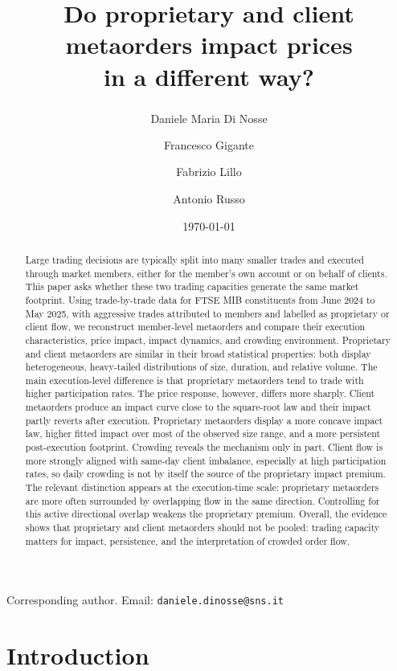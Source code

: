 \documentclass[11pt]{article}
\title{Do proprietary and client metaorders impact prices \\ in a different way?}
\author[1]{Daniele Maria Di Nosse\textsuperscript{\dag}}
\author[2]{Francesco Gigante}
\author[1]{Fabrizio Lillo}
\author[2]{Antonio Russo}
\affil[1]{Scuola Normale Superiore, Pisa, Italy}
\affil[2]{Consob, Rome, Italy}
\date{\today}
\begin{document}
\maketitle
\begin{center}
  \footnotesize
  \dag Corresponding author. Email: \texttt{daniele.dinosse@sns.it}
\end{center}

\begin{abstract}
Large trading decisions are typically split into many smaller trades and executed through market members, 
either for the member’s own account or on behalf of clients. This paper asks whether these two trading 
capacities generate the same market footprint. Using trade-by-trade data for FTSE MIB constituents from June 
2024 to May 2025, with aggressive trades attributed to members and labelled as proprietary or client flow, we 
reconstruct member-level metaorders and compare their execution characteristics, price impact, impact dynamics, 
and crowding environment.
Proprietary and client metaorders are similar in their broad statistical properties: both display heterogeneous, 
heavy-tailed distributions of size, duration, and relative volume. The main execution-level difference is that 
proprietary metaorders tend to trade with higher participation rates. The price response, however, differs more 
sharply. Client metaorders produce an impact curve close to the square-root law and their impact partly reverts 
after execution. Proprietary metaorders display a more concave impact law, higher fitted impact over most of the 
observed size range, and a more persistent post-execution footprint.
Crowding reveals the mechanism only in part. Client flow is more strongly aligned with same-day client imbalance, 
especially at high participation rates, so daily crowding is not by itself the source of the proprietary impact 
premium. The relevant distinction appears at the execution-time scale: proprietary metaorders are more often 
surrounded by overlapping flow in the same direction. Controlling for this active directional overlap weakens 
the proprietary premium. Overall, the evidence shows that proprietary and client metaorders should not be pooled: 
trading capacity matters for impact, persistence, and the interpretation of crowded order flow.
\end{abstract}

\section{Introduction}
\end{document}
